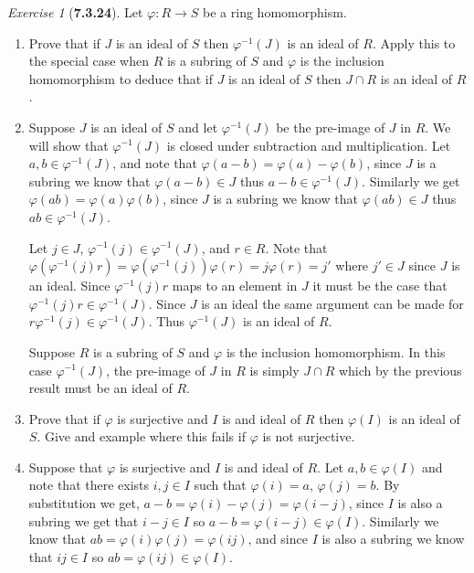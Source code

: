 \documentclass[12pt]{amsart}
\makeatletter
\theoremstyle{remark}
\newtheorem*{exercise}{Exercise}%
\renewenvironment{proof}[1][\proofname]{\par\doublespacing
  \pushQED{\qed}%
  \normalfont \topsep6\p@\@plus6\p@\relax
  \list{}{%
    \settowidth{\leftmargin}{\itshape\proofname:\hskip\labelsep}%
    \setlength{\labelwidth}{0pt}%
    \setlength{\itemindent}{-\leftmargin}%
  }%
  \item[\hskip\labelsep\itshape#1\@addpunct{:}]\ignorespaces
}{%
  \popQED\endlist\@endpefalse
  \singlespacing
}
\theoremstyle{mycomment}
\makeatother
\begin{document}
\begin{exercise}[\textbf{7.3.24}] Let $\varphi: R \to S$ be a ring homomorphism. 
  \begin{enumerate}
    \item[a.] Prove that if $J$ is an ideal of $S$ then $\varphi^{-1}(J)$ is an ideal of $R$. Apply this to the special case when $R$
    is a subring of $S$ and $\varphi$ is the inclusion homomorphism to deduce that if $J$ is an ideal of $S$ then $J \cap R$ is an ideal of $R$. 
    \begin{proof} Suppose $J$ is an ideal of $S$ and let $\varphi^{-1}(J)$ be the pre-image of $J$ in $R$. We will show that $\varphi^{-1}(J)$ is closed under 
      subtraction and multiplication. Let $a, b \in \varphi^{-1}(J)$, and note that $\varphi(a - b) = \varphi(a) - \varphi(b)$, since $J$ is a subring we know that $\varphi(a - b) \in J$ thus $a - b \in \varphi^{-1}(J)$.
      Similarly we get $\varphi(ab) = \varphi(a)\varphi(b)$, since $J$ is a subring we know that $\varphi(ab) \in J$ thus $ab \in \varphi^{-1}(J)$.
      

      Let $j \in J$, $\varphi^{-1}(j) \in \varphi^{-1}(J)$, and $r \in R$. 
      Note that $\varphi(\varphi^{-1}(j)r) = \varphi(\varphi^{-1}(j))\varphi(r) = j\varphi(r) = j'$ where $j' \in J$ since $J$ is an ideal. Since $\varphi^{-1}(j)r$ maps to an element in $J$
      it must be the case that $\varphi^{-1}(j)r \in \varphi^{-1}(J)$. Since $J$ is an ideal the same argument can be made for $r\varphi^{-1}(j) \in \varphi^{-1}(J)$. Thus $\varphi^{-1}(J)$ is an ideal of $R$.


      Suppose $R$ is a subring of $S$ and $\varphi$ is the inclusion homomorphism. In this case $\varphi^{-1}(J)$, the pre-image of $J$ in $R$ is simply $J \cap R$ which by the previous result must be an ideal of $R$. 
    \end{proof}
    \vspace{.15in}

    \item[b.] Prove that if $\varphi$ is surjective and $I$ is and ideal of $R$ then $\varphi(I)$ is an ideal of $S$. Give and example where this fails if $\varphi$ is not surjective. 
    \begin{proof} Suppose that $\varphi$ is surjective and $I$ is and ideal of $R$. Let $a, b \in \varphi(I)$ and note that there exists $i, j \in I$ such that $\varphi(i) = a$, $\varphi(j) = b$.
      By substitution we get, $a - b = \varphi(i) - \varphi(j) = \varphi(i - j)$, since $I$ is also a subring we get that $i - j \in I$ so $a - b = \varphi(i - j) \in \varphi(I)$. Similarly we know that 
      $ab = \varphi(i)\varphi(j) = \varphi(ij)$, and since $I$ is also a subring we know that $ij \in I$ so $ab = \varphi(ij) \in \varphi(I)$.


\end{proof}
\end{enumerate}
\end{exercise}
\end{document}
